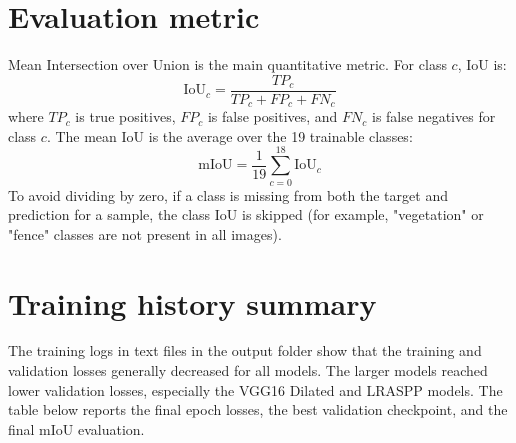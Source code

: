 \documentclass[12pt]{article}
\begin{document}
\section{Evaluation metric}
Mean Intersection over Union is the main quantitative metric. For class $c$, IoU is:
\[
\text{IoU}_c = \frac{TP_c}{TP_c + FP_c + FN_c}
\]
where $TP_c$ is true positives, $FP_c$ is false positives, and $FN_c$ is false negatives for class $c$. The mean IoU is the average over the 19 trainable classes:
\[
\text{mIoU} = \frac{1}{19}\sum_{c=0}^{18}\text{IoU}_c
\]
To avoid dividing by zero, if a class is missing from both the target and prediction for a sample, the class IoU is skipped (for example, "vegetation" or "fence" classes are not present in all images).

\section{Training history summary}
The training logs in text files in the output folder show that the training and validation losses generally decreased for all models. The larger models reached lower validation losses, especially the VGG16 Dilated and LRASPP models. The table below reports the final epoch losses, the best validation checkpoint, and the final mIoU evaluation.

\begin{center}
\small
\renewcommand{\arraystretch}{1.2}
\end{center}
\end{document}
